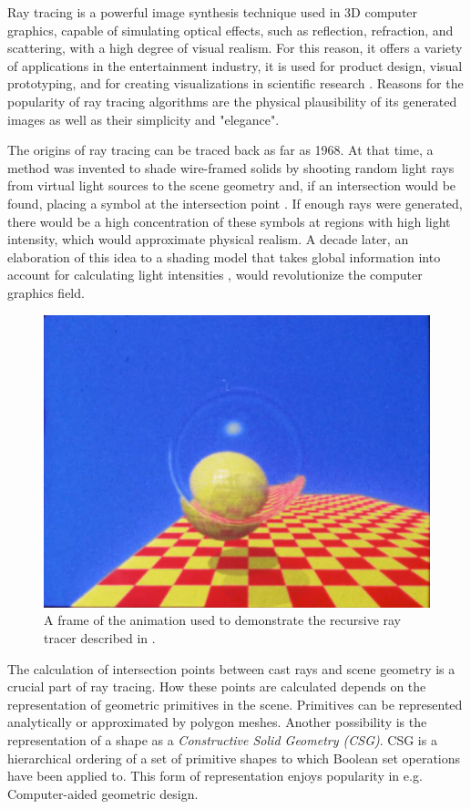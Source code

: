 \label{chap:intro}

Ray tracing is a powerful image synthesis technique used in 3D computer graphics, capable of simulating optical effects, such as reflection, refraction, and scattering, with a high degree of visual realism. For this reason, it offers a variety of applications in the entertainment industry, it is used for product design, visual prototyping, and for creating visualizations in scientific research \cite [91-128]{peddie2019ray}. Reasons for the popularity of ray tracing algorithms are the physical plausibility of its generated images as well as their simplicity and "elegance". 

The origins of ray tracing can be traced back as far as 1968. At that time, a method was invented to shade wire-framed solids by shooting random light rays from virtual light sources to the scene geometry and, if an intersection would be found, placing a symbol at the intersection point \cite{appel1968some}. If enough rays were generated, there would be a high concentration of these symbols at regions with high light intensity, which would approximate physical realism. A decade later, an elaboration of this idea to a shading model that takes global information into account for calculating light intensities  \cite{whitted1979improved}, would revolutionize the computer graphics field.

\begin{figure} \label{fig:whitted_result}
	\centering
	\includegraphics[width=.7\linewidth]{img/0 introduction/whitted_}
	\caption{A frame of the animation used to demonstrate the recursive ray tracer described in \cite{whitted1979improved}\cite{raytracingvideo}.}
	\label{fig:g}
\end{figure}

The calculation of intersection points between cast rays and scene geometry is a crucial part of ray tracing. How these points are calculated depends on the representation of geometric primitives in the scene. Primitives can be represented analytically or approximated by polygon meshes. Another possibility is the representation of a shape as a \emph{Constructive Solid Geometry (CSG)}. CSG is a hierarchical ordering of a set of primitive shapes to which Boolean set operations have been applied to. This form of representation enjoys popularity in e.g. Computer-aided geometric design.

